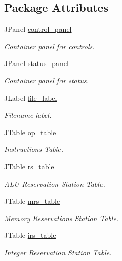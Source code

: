 \subsection*{\-Package \-Attributes}
\begin{DoxyCompactItemize}
\item 
\-J\-Panel \hyperlink{classTomasuloGUI_a04c211874e22ab75cd47d35dca120c9d}{control\-\_\-panel}
\begin{DoxyCompactList}\small\item\em \-Container panel for controls. \end{DoxyCompactList}\item 
\-J\-Panel \hyperlink{classTomasuloGUI_a34dc546fcc88949fbdaa5b588b5e18ea}{status\-\_\-panel}
\begin{DoxyCompactList}\small\item\em \-Container panel for status. \end{DoxyCompactList}\item 
\-J\-Label \hyperlink{classTomasuloGUI_aac9070de64d1efb4a849cb0eb20015c4}{file\-\_\-label}
\begin{DoxyCompactList}\small\item\em \-Filename label. \end{DoxyCompactList}\item 
\-J\-Table \hyperlink{classTomasuloGUI_a99dac43adb85dce62618469b155021f8}{op\-\_\-table}
\begin{DoxyCompactList}\small\item\em \-Instructions \-Table. \end{DoxyCompactList}\item 
\-J\-Table \hyperlink{classTomasuloGUI_a6ecd99ff02c80d24ecb2aa0ba2635fef}{rs\-\_\-table}
\begin{DoxyCompactList}\small\item\em \-A\-L\-U \-Reservation \-Station \-Table. \end{DoxyCompactList}\item 
\-J\-Table \hyperlink{classTomasuloGUI_a18580aaadebeefbfc8a2a6a6896d5a10}{mrs\-\_\-table}
\begin{DoxyCompactList}\small\item\em \-Memory \-Reservations \-Station \-Table. \end{DoxyCompactList}\item 
\-J\-Table \hyperlink{classTomasuloGUI_a0ef75f51c2dc43b3fc667bb1289d6cc0}{irs\-\_\-table}
\begin{DoxyCompactList}\small\item\em \-Integer \-Reservation \-Station \-Table. \end{DoxyCompactList}\item 

\end{DoxyCompactItemize}

